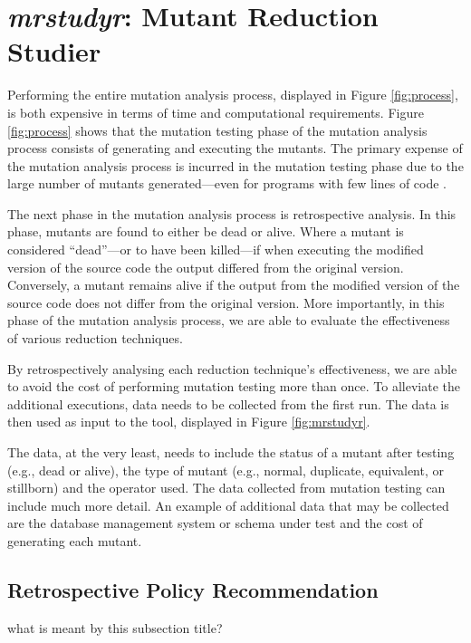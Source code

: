 

\section{\textit{mrstudyr}: Mutant Reduction Studier}

Performing the entire mutation analysis process, displayed in Figure \ref{fig:process},
is both expensive in terms of time and computational requirements. Figure
\ref{fig:process} shows that the mutation testing phase of the mutation analysis
process consists of generating and executing the mutants. The primary
expense of the mutation analysis process is incurred in the mutation testing phase
due to the large number of mutants generated---even for programs with few lines of code \cite{offutt2001mutation}.

The next phase in the mutation analysis process is retrospective analysis. In this
phase, mutants are found to either be dead or alive. Where a mutant is considered
``dead''---or to have been killed---if when executing the modified version of the source
code the output differed from the original version. Conversely, a mutant remains alive
if the output from the modified version of the source code does not differ from the
original version. More importantly, in this phase of the mutation analysis process,
we are able to evaluate the effectiveness of various reduction techniques.

By retrospectively analysing each reduction technique's effectiveness, we are
able to avoid the cost of performing mutation testing more than once. To alleviate
the additional executions, data needs to be collected
from the first run. The data is then used as input to the \mr tool, displayed
in Figure \ref{fig:mrstudyr}.

The data, at the very least, needs to include the status of
a mutant after testing (e.g., dead or alive), the type of mutant (e.g., normal, duplicate, equivalent, or stillborn)
and the operator used. The data collected from mutation testing can include much
more detail. An example of additional data that may be collected are the database
management system or schema under test and the cost of generating each mutant.

\subsection{Retrospective Policy Recommendation}
what is meant by this subsection title?

